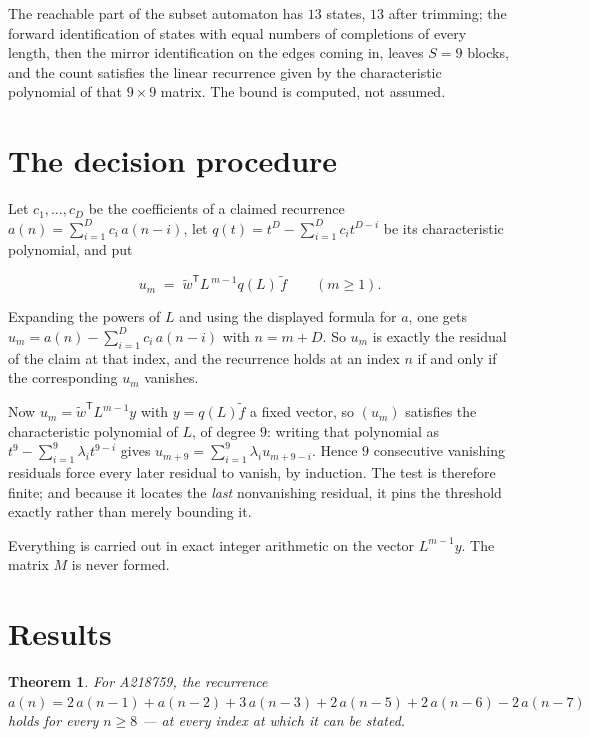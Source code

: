 \documentclass[11pt]{article}
\newtheorem{theorem}{Theorem}
\theoremstyle{definition}
\begin{document}
The reachable part of the subset automaton has $13$ states, $13$ after trimming; the forward identification of states with equal numbers of completions of every length, then the mirror identification on the edges coming in, leaves $S = 9$ blocks, and the count satisfies the linear recurrence given by the characteristic polynomial of that $9\times9$ matrix. The bound is computed, not assumed.

\section{The decision procedure}

Let $c_1,\dots,c_D$ be the coefficients of a claimed recurrence $a(n) = \sum_{i=1}^{D} c_i\,a(n-i)$, let $q(t) = t^{D} - \sum_{i=1}^{D} c_i t^{D-i}$ be its characteristic polynomial, and put

\[u_m \;=\; \tilde w^{\mathsf T} L^{\,m-1} q(L)\,\tilde f \qquad (m \ge 1).\]

Expanding the powers of $L$ and using the displayed formula for $a$, one gets $u_m = a(n) - \sum_{i=1}^{D} c_i\,a(n-i)$ with $n = m + D$. So $u_m$ is exactly the residual of the claim at that index, and the recurrence holds at an index $n$ if and only if the corresponding $u_m$ vanishes.

Now $u_m = \tilde w^{\mathsf T} L^{m-1} y$ with $y = q(L)\tilde f$ a fixed vector, so $(u_m)$ satisfies the characteristic polynomial of $L$, of degree $9$: writing that polynomial as $t^{9} - \sum_{i=1}^{9} \lambda_i t^{9-i}$ gives $u_{m+9} = \sum_{i=1}^{9} \lambda_i u_{m+9-i}$. Hence $9$ consecutive vanishing residuals force every later residual to vanish, by induction. The test is therefore finite; and because it locates the {\itshape last} nonvanishing residual, it pins the threshold exactly rather than merely bounding it.

Everything is carried out in exact integer arithmetic on the vector $L^{m-1}y$. The matrix $M$ is never formed.

\section{Results}

\begin{theorem} For A218759, the recurrence $a(n) = 2\,a(n-1) + a(n-2) + 3\,a(n-3) + 2\,a(n-5) + 2\,a(n-6) - 2\,a(n-7)$ holds for every $n \ge 8$ --- at every index at which it can be stated.\end{theorem}
\end{document}
